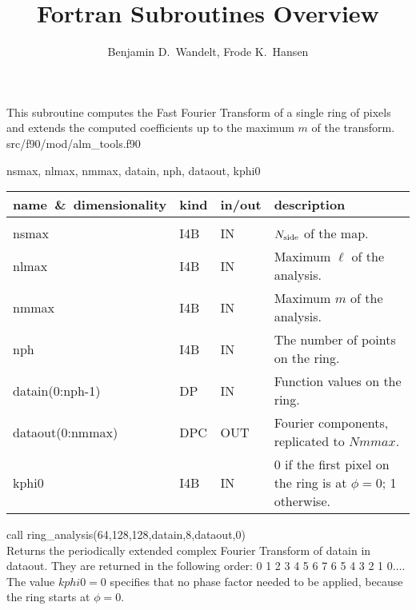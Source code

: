 
\sloppy


\title{\healpix Fortran Subroutines Overview}
 \section[ring\_analysis]{ }
\label{sub:ring_analysis}
\author{Benjamin D.~Wandelt, Frode K.~Hansen}

\begin{facility}
{This subroutine computes the Fast Fourier Transform of a single ring
 of pixels
 and extends the computed coefficients up to the maximum
 $m$ of the transform.}
{src/f90/mod/alm\_tools.f90}
\end{facility}

\begin{f90format}
{nsmax, nlmax, nmmax, datain, nph, dataout, kphi0}
\end{f90format}

\begin{arguments}
{
\begin{tabular}{p{0.4\hsize} p{0.05\hsize} p{0.1\hsize} p{0.35\hsize}} \hline  
\textbf{name~\&~dimensionality} & \textbf{kind} & \textbf{in/out} & \textbf{description} \\ \hline
                   &   &   &                           \\ %
nsmax & I4B & IN & ${N_{\rm side}}$ of the map. \\
nlmax & I4B & IN & Maximum $\ell$ of the analysis.\\
nmmax & I4B & IN & Maximum $m$ of the analysis.\\
nph & I4B & IN & The number of points on the ring. \\ 
datain(0:nph-1) & DP & IN & Function values on the ring. \\
dataout(0:nmmax) & DPC & OUT & Fourier components, replicated to $Nmmax$.\\
kphi0 & I4B & IN & 0 if the first pixel on the ring is  at
                   $\phi=0$; 1 otherwise. \\
\end{tabular}
}
\end{arguments}

\begin{example}
{
call ring\_analysis(64,128,128,datain,8,dataout,0)  \\
}
{
Returns the periodically extended complex 
Fourier Transform of datain in
dataout. They are returned in the following order: 0 1 2 3 4 5 6 7
6 5 4 3 2 1 $0\dots$. The value $kphi0=0$ specifies that no phase
factor needed to be applied, because the ring starts at $\phi=0$.
}
\end{example}

